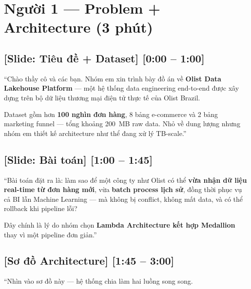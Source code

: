 \documentclass[12pt, a4paper]{article}
\newenvironment{speakerbox}[2]{%
  \begin{tcolorbox}[
    enhanced, breakable,
    colback=#1!6!white,
    colframe=#1,
    colbacktitle=#1,
    coltitle=white,
    fonttitle=\bfseries\large,
    title={#2},
    arc=4pt,
    boxrule=1.5pt,
    left=8pt, right=8pt, top=6pt, bottom=6pt,
  ]
}{%
  \end{tcolorbox}
}
\newcommand{\timing}[1]{%
  \hfill{\small\bfseries\color{gray}[#1]}%
}
\begin{document}
\newpage

\section{Người 1 — Problem + Architecture (3 phút)}

\begin{speakerbox}{p1color}{\faUser\ Người 1 · 0:00 -- 3:00}

\subsection*{[Slide: Tiêu đề + Dataset] \timing{0:00 -- 1:00}}

\begin{scriptbox}
``Chào thầy cô và các bạn. Nhóm em xin trình bày đồ án về \textbf{Olist Data Lakehouse
Platform} --- một hệ thống data engineering end-to-end được xây dựng trên bộ dữ liệu
thương mại điện tử thực tế của Olist Brazil.

Dataset gồm hơn \textbf{100 nghìn đơn hàng}, 8 bảng e-commerce và 2 bảng marketing funnel ---
tổng khoảng 200~MB raw data. Nhỏ về dung lượng nhưng nhóm em thiết kế architecture
như thể đang xử lý TB-scale.''
\end{scriptbox}

\subsection*{[Slide: Bài toán] \timing{1:00 -- 1:45}}

\begin{scriptbox}
``Bài toán đặt ra là: làm sao để một công ty như Olist có thể \textbf{vừa nhận dữ liệu real-time
từ đơn hàng mới}, vừa \textbf{batch process lịch sử}, đồng thời phục vụ cả BI lẫn
Machine Learning --- mà không bị conflict, không mất data, và có thể rollback khi
pipeline lỗi?

Đây chính là lý do nhóm chọn \textbf{Lambda Architecture kết hợp Medallion} thay vì
một pipeline đơn giản.''
\end{scriptbox}

\subsection*{[Sơ đồ Architecture] \timing{1:45 -- 3:00}}

\begin{scriptbox}
``Nhìn vào sơ đồ này --- hệ thống chia làm hai luồng song song.


\end{scriptbox}
\end{speakerbox}
\end{document}
